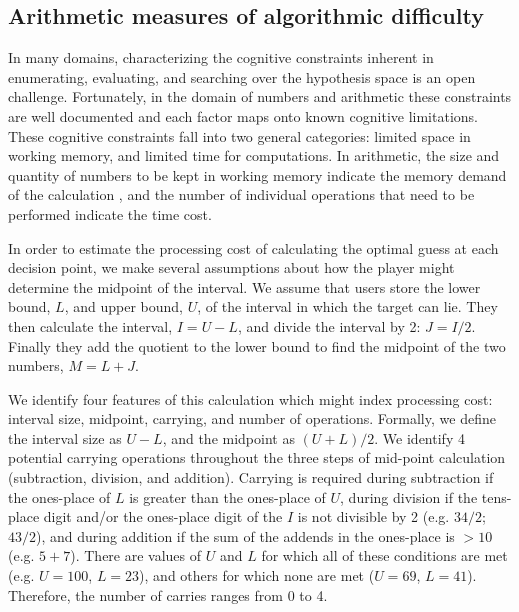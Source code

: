 \documentclass[10pt,letterpaper]{article}
\begin{document}
\subsection{Arithmetic measures of algorithmic difficulty}

In many domains, characterizing the cognitive constraints inherent in enumerating, evaluating, and searching over the hypothesis space is an open challenge. Fortunately, in the domain of numbers and arithmetic these constraints are well documented and each factor maps onto known cognitive limitations.
These cognitive constraints fall into two general categories: limited space in working memory, and limited time for computations. 
In arithmetic, the size and quantity of numbers to be kept in working memory indicate the memory demand of the calculation \cite{DEHAENE2003145}, and the number of individual operations that need to be performed indicate the time cost.

In order to estimate the processing cost of calculating the optimal guess at each decision point, we make several assumptions about how the player might determine the midpoint of the interval. We assume that users store the lower bound, $L$, and upper bound, $U$, of the interval in which the target can lie. They then calculate the interval, $I = U - L$, and divide the interval by 2: $J = I / 2$. Finally they add the quotient to the lower bound to find the midpoint of the two numbers, $M = L + J$.


We identify four features of this calculation which might index processing cost: interval size, midpoint, carrying, and number of operations. 
Formally, we define the interval size as $U - L$, and the midpoint as $(U + L) / 2$. We identify 4 potential carrying operations throughout the three steps of mid-point calculation (subtraction, division, and addition). Carrying is required during subtraction if the ones-place of $L$ is greater than the ones-place of $U$, during division if the tens-place digit and/or the ones-place digit of the $I$ is not divisible by 2 (e.g. $34 / 2$; $43 / 2$), and during addition if the sum of the addends in the ones-place is $>10$ (e.g. $5 + 7$). There are values of $U$ and $L$ for which all of these conditions are met (e.g. $U = 100$, $L = 23$), and others for which none are met ($U = 69$, $L = 41$). Therefore, the number of carries ranges from 0 to 4.
\end{document}
